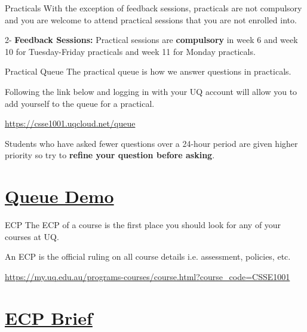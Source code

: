 \documentclass[week2]{csse1001}
\begin{document}
\begin{topic}{Practicals}
With the exception of feedback sessions, practicals are not compulsory and you are welcome to attend practical sessions that you are not enrolled into.

\begin{subtopic}{2-}
\textbf{Feedback Sessions:} Practical sessions are \textbf{compulsory} in week 6 and week 10 for Tuesday-Friday practicals and week 11 for Monday practicals.
\end{subtopic}
\end{topic}

\begin{topic}{Practical Queue}
The practical queue is how we answer questions in practicals.

Following the link below and logging in with your UQ account will allow you to add yourself to the queue for a practical.

\url{https://csse1001.uqcloud.net/queue}

Students who have asked fewer questions over a 24-hour period are given higher priority so try to \textbf{refine your question before asking}.
\end{topic}

\section{\href{https://csse1001.uqcloud.net/queue}{Queue Demo}}

\begin{topic}{ECP}
The ECP of a course is the first place you should look for any of your courses at UQ.

An ECP is the official ruling on all course details i.e. assessment, policies, etc.

\url{https://my.uq.edu.au/programs-courses/course.html?course_code=CSSE1001}
\end{topic}

\section{\href{https://my.uq.edu.au/programs-courses/course.html?course_code=CSSE1001}{ECP Brief}}
\end{document}
